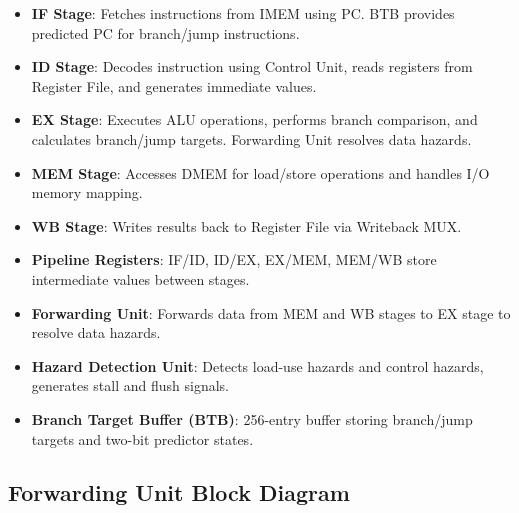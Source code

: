 \begin{itemize}
    \item \textbf{IF Stage}: Fetches instructions from IMEM using PC. BTB provides predicted PC for branch/jump instructions.
    \item \textbf{ID Stage}: Decodes instruction using Control Unit, reads registers from Register File, and generates immediate values.
    \item \textbf{EX Stage}: Executes ALU operations, performs branch comparison, and calculates branch/jump targets. Forwarding Unit resolves data hazards.
    \item \textbf{MEM Stage}: Accesses DMEM for load/store operations and handles I/O memory mapping.
    \item \textbf{WB Stage}: Writes results back to Register File via Writeback MUX.
    \item \textbf{Pipeline Registers}: IF/ID, ID/EX, EX/MEM, MEM/WB store intermediate values between stages.
    \item \textbf{Forwarding Unit}: Forwards data from MEM and WB stages to EX stage to resolve data hazards.
    \item \textbf{Hazard Detection Unit}: Detects load-use hazards and control hazards, generates stall and flush signals.
    \item \textbf{Branch Target Buffer (BTB)}: 256-entry buffer storing branch/jump targets and two-bit predictor states.
\end{itemize}

\subsection{Forwarding Unit Block Diagram}

